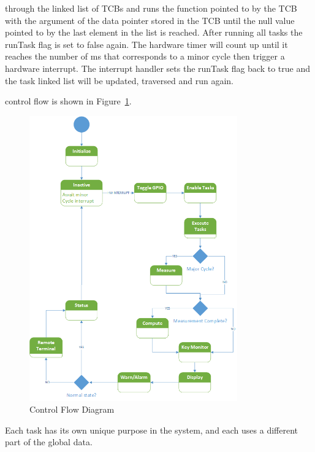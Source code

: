 \documentclass[12pt]{article} %
\begin{document}
    through the linked list of TCBs and runs the function pointed to by the TCB with the
    argument of the data pointer stored in the TCB until the null value pointed to by the last element in the list is reached. After running all  tasks the
    runTask flag is set to false again. The hardware timer will count up until it reaches the number of ms that corresponds to a minor cycle then trigger a hardware interrupt. The interrupt handler sets the runTask flag back to true and the task linked list will be updated, traversed and run again.
    
    control flow is shown in Figure~\ref{fig:Control}. 

    \begin{figure}[h]
      \centering
      \includegraphics[width=0.8\textwidth]{../design/Control_state_diagram.png}
      \caption{Control Flow Diagram}
      \label{fig:Control}
    \end{figure}

    Each task has its own unique purpose in the system, and each uses a different
    part of the global data.
\end{document}
